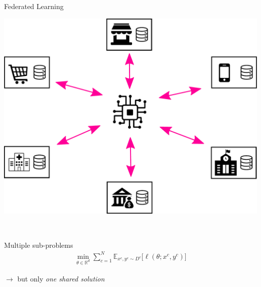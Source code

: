 \documentclass[aspectratio=169,12pt]{beamer}
\begin{document}
\begin{frame}{Federated Learning}
  
  \begin{minipage}{0.4\linewidth}
    \begin{center}
      \includegraphics[width=\linewidth]{images/federated-training.pdf}
    \end{center}
    
  \end{minipage}~~~~%
  \pause
  \begin{minipage}{0.5\linewidth}
    \begin{center}
      Multiple sub-problems
      \begin{align*}
        \min_{\theta \in \mathbb{R}^d} 
        \sum_{c=1}^N \mathbb{E}_{x^c, y^c \sim D^c} \Big[ \ell( \theta; x^c, y^c ) \Big]
      \end{align*}
      
      $\rightarrow$ but only \emph{one shared solution}
    \end{center}
    
  \end{minipage}

\end{frame}
\end{document}

